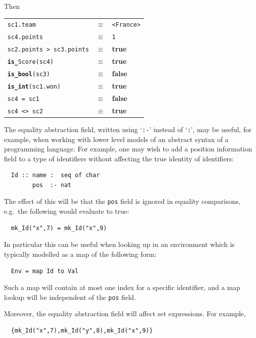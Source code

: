 \documentclass{overturerepchap}
\newcommand{\keyw}[1]{{\bf\ttfamily #1}}
\begin{document}
\begin{description}
\noindent%
Then

  \begin{tabular}{lcl}
    \texttt{sc1.team}            & $\equiv$ & \texttt{<France>}\\
    \texttt{sc4.points}          & $\equiv$ & \texttt{1}\\
    \texttt{sc2.points > sc3.points} 
                                 & $\equiv$ & \keyw{true}\\
    \texttt{\keyw{is\_}Score(sc4)} 
                                 & $\equiv$ & \keyw{true}\\
    \texttt{\keyw{is\_bool}(sc3)}
                                 & $\equiv$ & \keyw{false}\\
    \texttt{\keyw{is\_int}(sc1.won)}
                                 & $\equiv$ & \keyw{true}\\
    \texttt{sc4 = sc1}           & $\equiv$ & \keyw{false}\\
    \texttt{sc4 <> sc2}          & $\equiv$ & \keyw{true}  
  \end{tabular}

  The equality abstraction field, written using `{\tt :-}' instead of
  `{\tt :}', may be useful, for example, when working with lower level
  models of an abstract syntax of a programming language. For example,
  one may wish to add a position information field to a type of
  identifiers without affecting the true identity of identifiers:

\begin{lstlisting}
  Id :: name :  seq of char
        pos  :- nat
\end{lstlisting}

The effect of this will be that the {\tt pos} field is
ignored in equality comparisons, e.g.\
the following would evaluate to true:

\begin{lstlisting}
  mk_Id("x",7) = mk_Id("x",9)
\end{lstlisting}

In particular this can be useful when looking up in an environment
which is typically modelled as a map of the following form:

\begin{lstlisting}
  Env = map Id to Val
\end{lstlisting}

Such a map will contain at most one index for a specific identifier,
and a map lookup will be independent of the {\tt pos} field.

Moreover, the equality abstraction field will affect set expressions.
For example, 
\begin{lstlisting}
  {mk_Id("x",7),mk_Id("y",8),mk_Id("x",9)}
\end{lstlisting}


\end{description}
\end{document}
